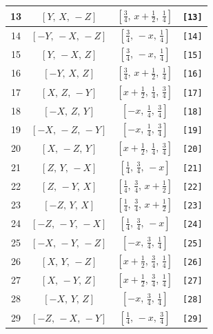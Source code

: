 \documentclass[fleqn,8pt]{jsarticle}
\begin{document}
\begin{longtable}{cccc}
13 & $\left[ Y,\, X,\, - Z \right]$ & $\left[ \frac{3}{4},\, x + \frac{1}{2},\, \frac{1}{4} \right]$ & {\tt [13]} \\ \hline
14 & $\left[ - Y,\, - X,\, - Z \right]$ & $\left[ \frac{3}{4},\, - x,\, \frac{1}{4} \right]$ & {\tt [14]} \\ \hline
15 & $\left[ Y,\, - X,\, Z \right]$ & $\left[ \frac{3}{4},\, - x,\, \frac{1}{4} \right]$ & {\tt [15]} \\ \hline
16 & $\left[ - Y,\, X,\, Z \right]$ & $\left[ \frac{3}{4},\, x + \frac{1}{2},\, \frac{1}{4} \right]$ & {\tt [16]} \\ \hline
17 & $\left[ X,\, Z,\, - Y \right]$ & $\left[ x + \frac{1}{2},\, \frac{1}{4},\, \frac{3}{4} \right]$ & {\tt [17]} \\ \hline
18 & $\left[ - X,\, Z,\, Y \right]$ & $\left[ - x,\, \frac{1}{4},\, \frac{3}{4} \right]$ & {\tt [18]} \\ \hline
19 & $\left[ - X,\, - Z,\, - Y \right]$ & $\left[ - x,\, \frac{1}{4},\, \frac{3}{4} \right]$ & {\tt [19]} \\ \hline
20 & $\left[ X,\, - Z,\, Y \right]$ & $\left[ x + \frac{1}{2},\, \frac{1}{4},\, \frac{3}{4} \right]$ & {\tt [20]} \\ \hline
21 & $\left[ Z,\, Y,\, - X \right]$ & $\left[ \frac{1}{4},\, \frac{3}{4},\, - x \right]$ & {\tt [21]} \\ \hline
22 & $\left[ Z,\, - Y,\, X \right]$ & $\left[ \frac{1}{4},\, \frac{3}{4},\, x + \frac{1}{2} \right]$ & {\tt [22]} \\ \hline
23 & $\left[ - Z,\, Y,\, X \right]$ & $\left[ \frac{1}{4},\, \frac{3}{4},\, x + \frac{1}{2} \right]$ & {\tt [23]} \\ \hline
24 & $\left[ - Z,\, - Y,\, - X \right]$ & $\left[ \frac{1}{4},\, \frac{3}{4},\, - x \right]$ & {\tt [24]} \\ \hline
25 & $\left[ - X,\, - Y,\, - Z \right]$ & $\left[ - x,\, \frac{3}{4},\, \frac{1}{4} \right]$ & {\tt [25]} \\ \hline
26 & $\left[ X,\, Y,\, - Z \right]$ & $\left[ x + \frac{1}{2},\, \frac{3}{4},\, \frac{1}{4} \right]$ & {\tt [26]} \\ \hline
27 & $\left[ X,\, - Y,\, Z \right]$ & $\left[ x + \frac{1}{2},\, \frac{3}{4},\, \frac{1}{4} \right]$ & {\tt [27]} \\ \hline
28 & $\left[ - X,\, Y,\, Z \right]$ & $\left[ - x,\, \frac{3}{4},\, \frac{1}{4} \right]$ & {\tt [28]} \\ \hline
29 & $\left[ - Z,\, - X,\, - Y \right]$ & $\left[ \frac{1}{4},\, - x,\, \frac{3}{4} \right]$ & {\tt [29]} \\ \hline

\end{longtable}
\end{document}
